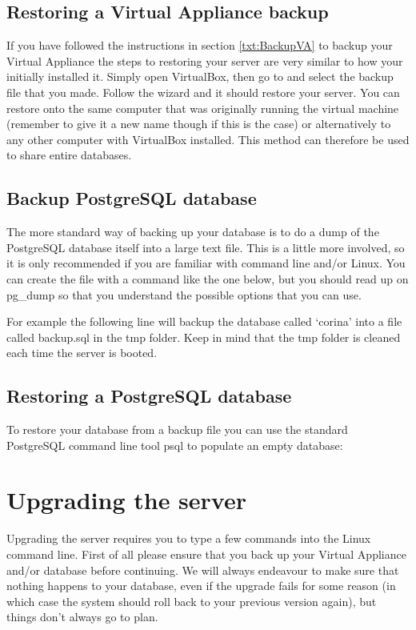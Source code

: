 \subsection{Restoring a Virtual Appliance backup}
If you have followed the instructions in section \ref{txt:BackupVA} to backup your Virtual Appliance the steps to restoring your server are very similar to how your initially installed it.  Simply open VirtualBox, then go to  and select the backup file that you made.  Follow the wizard and it should restore your server.  You can restore onto the same computer that was originally running the virtual machine (remember to give it a new name though if this is the case) or alternatively to any other computer with VirtualBox installed.  This method can therefore be used to share entire databases.


\subsection{Backup PostgreSQL database}
The more standard way of backing up your database is to do a dump of the PostgreSQL database itself into a large text file.  This is a little more involved, so it is only recommended if you are familiar with command line and/or Linux.  You can create the file with a command like the one below, but you should read up on pg\_dump so that you understand the possible options that you can use.


For example the following line will backup the database called `corina' into a file called backup.sql in the tmp folder.  Keep in mind that the tmp folder is cleaned each time the server is booted.



\subsection{Restoring a PostgreSQL database}
To restore your database from a backup file you can use the standard PostgreSQL command line tool psql to populate an empty database:




\section{Upgrading the server}
Upgrading the server requires you to type a few commands into the Linux command line.  First of all please ensure that you back up your Virtual Appliance and/or database before continuing.  We will always endeavour to make sure that nothing happens to your database, even if the upgrade fails for some reason (in which case the system should roll back to your previous version again), but things don't always go to plan.

